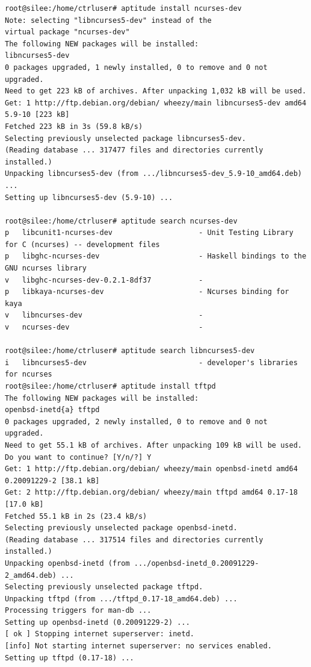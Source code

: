 \documentclass[11pt
  , a4paper
  , article
  , oneside
]{memoir}
\begin{document}
\begin{lstlisting}[style=termstyle]
root@silee:/home/ctrluser# aptitude install ncurses-dev
Note: selecting "libncurses5-dev" instead of the
virtual package "ncurses-dev"
The following NEW packages will be installed:
libncurses5-dev 
0 packages upgraded, 1 newly installed, 0 to remove and 0 not upgraded.
Need to get 223 kB of archives. After unpacking 1,032 kB will be used.
Get: 1 http://ftp.debian.org/debian/ wheezy/main libncurses5-dev amd64 5.9-10 [223 kB]
Fetched 223 kB in 3s (59.8 kB/s)          
Selecting previously unselected package libncurses5-dev.
(Reading database ... 317477 files and directories currently installed.)
Unpacking libncurses5-dev (from .../libncurses5-dev_5.9-10_amd64.deb) ...
Setting up libncurses5-dev (5.9-10) ...

root@silee:/home/ctrluser# aptitude search ncurses-dev
p   libcunit1-ncurses-dev                    - Unit Testing Library for C (ncurses) -- development files          
p   libghc-ncurses-dev                       - Haskell bindings to the GNU ncurses library                        
v   libghc-ncurses-dev-0.2.1-8df37           -                                                                    
p   libkaya-ncurses-dev                      - Ncurses binding for kaya                                           
v   libncurses-dev   						 -                                                                    
v   ncurses-dev                              -                                                                 
   
root@silee:/home/ctrluser# aptitude search libncurses5-dev
i   libncurses5-dev                          - developer's libraries for ncurses                                  
root@silee:/home/ctrluser# aptitude install tftpd
The following NEW packages will be installed:
openbsd-inetd{a} tftpd 
0 packages upgraded, 2 newly installed, 0 to remove and 0 not upgraded.
Need to get 55.1 kB of archives. After unpacking 109 kB will be used.
Do you want to continue? [Y/n/?] Y
Get: 1 http://ftp.debian.org/debian/ wheezy/main openbsd-inetd amd64 0.20091229-2 [38.1 kB]
Get: 2 http://ftp.debian.org/debian/ wheezy/main tftpd amd64 0.17-18 [17.0 kB]
Fetched 55.1 kB in 2s (23.4 kB/s)  
Selecting previously unselected package openbsd-inetd.
(Reading database ... 317514 files and directories currently installed.)
Unpacking openbsd-inetd (from .../openbsd-inetd_0.20091229-2_amd64.deb) ...
Selecting previously unselected package tftpd.
Unpacking tftpd (from .../tftpd_0.17-18_amd64.deb) ...
Processing triggers for man-db ...
Setting up openbsd-inetd (0.20091229-2) ...
[ ok ] Stopping internet superserver: inetd.
[info] Not starting internet superserver: no services enabled.
Setting up tftpd (0.17-18) ...


\end{lstlisting}
\end{document}
